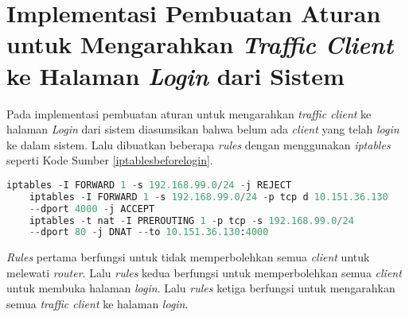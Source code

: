   \section{Implementasi Pembuatan Aturan untuk Mengarahkan \textit{Traffic Client} ke Halaman \textit{Login} dari Sistem}
  Pada implementasi pembuatan aturan untuk mengarahkan \textit{traffic client} ke halaman \textit{Login} dari sistem diasumsikan bahwa belum ada \textit{client} yang telah \textit{login} ke dalam sistem. Lalu dibuatkan beberapa \textit{rules} dengan menggunakan \textit{iptables} seperti Kode Sumber \ref{iptablesbeforelogin}. \\
  \begin{minipage}{\linewidth}
  	\begin{lstlisting}[caption=Command untuk mengarahkan \textit{client} ke halaman \textit{login},language=Python,label=iptablesbeforelogin]
  	iptables -I FORWARD 1 -s 192.168.99.0/24 -j REJECT
  	iptables -I FORWARD 1 -s 192.168.99.0/24 -p tcp d 10.151.36.130
  	--dport 4000 -j ACCEPT
  	iptables -t nat -I PREROUTING 1 -p tcp -s 192.168.99.0/24
  	--dport 80 -j DNAT --to 10.151.36.130:4000
  	\end{lstlisting}
  \end{minipage}
  
  \textit{Rules} pertama berfungsi untuk tidak memperbolehkan semua \textit{client} untuk melewati \textit{router}. Lalu \textit{rules} kedua berfungsi untuk memperbolehkan semua \textit{client} untuk membuka halaman \textit{login}. Lalu \textit{rules} ketiga berfungsi untuk mengarahkan semua \textit{traffic client} ke halaman \textit{login}.
  
